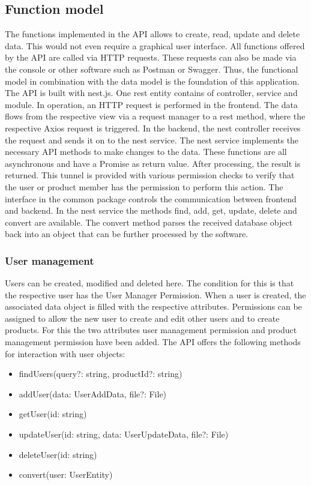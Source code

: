     \subsection*{Function model} 
    The functions implemented in the API allows to create, read, update and delete data. This would not even require a graphical user interface. All functions offered by the API are called via HTTP requests. These requests can also be made via the console or other software such as Postman or Swagger. Thus, the functional model in combination with the data model is the foundation of this application. The API is built with nest.js. One rest entity contains of controller, service and module. In operation, an HTTP request is performed in the frontend. The data flows from the respective view via a request manager to a rest method, where the respective Axios request is triggered. In the backend, the nest controller receives the request and sends it on to the nest service. The nest service implements the necessary API methods to make changes to the data. These functions are all asynchronous and have a Promise as return value. After processing, the result is returned. This tunnel is provided with various permission checks to verify that the user or product member has the permission to perform this action. The interface in the common package controls the communication between frontend and backend. In the nest service the methods find, add, get, update, delete and convert are available. The convert method parses the received database object back into an object that can be further processed by the software.

    \subsubsection*{User management}
    Users can be created, modified and deleted here. The condition for this is that the respective user has the User Manager Permission. When a user is created, the associated data object is filled with the respective attributes. Permissions can be assigned to allow the new user to create and edit other users and to create products. For this the two attributes user management permission and product management permission have been added. The API offers the following methods for interaction with user objects:
    
    \begin{itemize}
        \item findUsers(query?: string, productId?: string) 
        \item addUser(data: UserAddData, file?: File)
        \item getUser(id: string)
        \item updateUser(id: string, data: UserUpdateData, file?: File)
        \item deleteUser(id: string)
        \item convert(user: UserEntity)
    \end{itemize}

